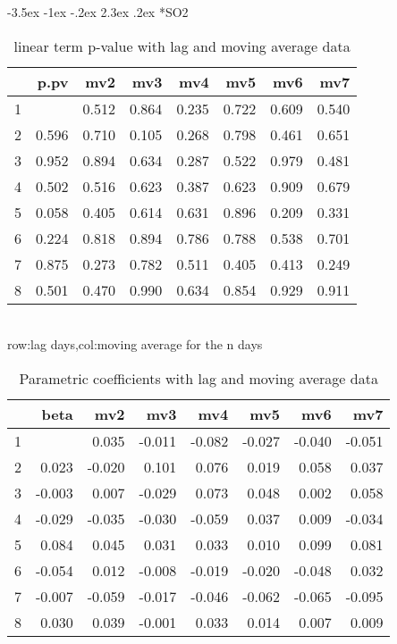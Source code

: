 \documentclass[a4paper, 12pt]{article}
\makeatletter
\def\large{\fontsize{14}{20}\selectfont}
\renewcommand\subsection{\@startsection {subsection}{1}{\z@}%
                                   {-3.5ex \@plus -1ex \@minus -.2ex}%
                                   {2.3ex \@plus.2ex}%
                                   {\centering\normalfont\large\bfseries}}
\makeatother
\begin{document}
\clearpage
\subsection*{SO2}
\begin{table}[h]
\centering
\caption{linear term p-value with lag and moving average data}
\begin{tabular}{rrrrrrrr}
  \hline
 & p.pv & mv2 & mv3 & mv4 & mv5 & mv6 & mv7 \\
  \hline
1 & \color{red}{0.026} & 0.512 & 0.864 & 0.235 & 0.722 & 0.609 & 0.540 \\
  2 & 0.596 & 0.710 & 0.105 & 0.268 & 0.798 & 0.461 & 0.651 \\
  3 & 0.952 & 0.894 & 0.634 & 0.287 & 0.522 & 0.979 & 0.481 \\
  4 & 0.502 & 0.516 & 0.623 & 0.387 & 0.623 & 0.909 & 0.679 \\
  5 & 0.058 & 0.405 & 0.614 & 0.631 & 0.896 & 0.209 & 0.331 \\
  6 & 0.224 & 0.818 & 0.894 & 0.786 & 0.788 & 0.538 & 0.701 \\
  7 & 0.875 & 0.273 & 0.782 & 0.511 & 0.405 & 0.413 & 0.249 \\
  8 & 0.501 & 0.470 & 0.990 & 0.634 & 0.854 & 0.929 & 0.911 \\
   \hline
\end{tabular}
\\row:lag days,col:moving average for the n days
\end{table}

\begin{table}[h]
\centering
\caption{Parametric coefficients with lag and moving average data}
\begin{tabular}{rrrrrrrr}
  \hline
 & beta & mv2 & mv3 & mv4 & mv5 & mv6 & mv7 \\
  \hline
1 & \color{red}{-0.097} & 0.035 & -0.011 & -0.082 & -0.027 & -0.040 & -0.051 \\
  2 & 0.023 & -0.020 & 0.101 & 0.076 & 0.019 & 0.058 & 0.037 \\
  3 & -0.003 & 0.007 & -0.029 & 0.073 & 0.048 & 0.002 & 0.058 \\
  4 & -0.029 & -0.035 & -0.030 & -0.059 & 0.037 & 0.009 & -0.034 \\
  5 & 0.084 & 0.045 & 0.031 & 0.033 & 0.010 & 0.099 & 0.081 \\
  6 & -0.054 & 0.012 & -0.008 & -0.019 & -0.020 & -0.048 & 0.032 \\
  7 & -0.007 & -0.059 & -0.017 & -0.046 & -0.062 & -0.065 & -0.095 \\
  8 & 0.030 & 0.039 & -0.001 & 0.033 & 0.014 & 0.007 & 0.009 \\
   \hline
\end{tabular}
\end{table}
\clearpage
\end{document}
